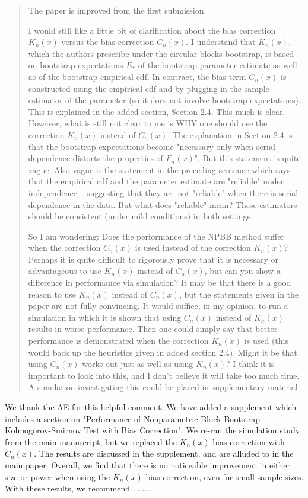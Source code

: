 \documentclass[12pt]{article}
\newenvironment{comment}%
{\begin{quotation}\noindent\small\it\color{darkblue}\ignorespaces%
}{\end{quotation}}
\begin{document}
\begin{comment}
The paper is improved from the first submission.

I would still like a little bit of clarification about the bias correction $K_n(x)$ versus the bias correction $C_n(x)$. I understand that $K_n(x)$, which the authors prescribe under the circular blocks bootstrap, is based on bootstrap expectations $E_*$ of the bootstrap parameter estimate as well as of the bootstrap empirical cdf. In contract, the bias term $C_n(x)$ is constructed using the empirical cdf and by plugging in the sample estimator of the parameter (so it does not involve bootstrap expectations).  This is explained in the added section, Section 2.4.  This much is clear. However, what is still not clear to me is WHY one should use the correction $K_n(x)$ instead of $C_n(x)$. The explanation in Section 2.4 is that the bootstrap expectations become "necessary only when serial dependence distorts the properties of $F_n(x)$".  But this statement is quite vague.  Also vague is the statement in the preceding sentence which says that the empirical cdf and the parameter estimate are "reliable" under independence -- suggesting that they are not "reliable" when there is serial dependence in the data.  But what does "reliable" mean? These estimators should be consistent (under mild conditions) in both settings.

So I am wondering: Does the performance of the NPBB method suffer when the correction $C_n(x)$ is used instead of the correction $K_n(x)$?  Perhaps it is quite difficult to rigorously prove that it is necessary or advantageous to use $K_n(x)$ instead of $C_n(x)$, but can you show a difference in performance via simulation?  It may be that there is a good reason to use $K_n(x)$ instead of $C_n(x)$, but the statements given in the paper are not fully convincing.   It would suffice, in my opinion, to run a simulation in which it is shown that using $C_n(x)$ instead of $K_n(x)$ results in worse performance.  Then one could simply say that better performance is demonstrated when the correction $K_n(x)$ is used (this would back up the heuristics given in added section 2.4). Might it be that using $C_n(x)$ works out just as well as using $K_n(x)$?  I think it is important to look into this, and I don't believe it will take too much time. A simulation investigating this could be placed in supplementary material.
\end{comment}

We thank the AE for this helpful comment. We have added a supplement
which includes a section on "Performance of Nonparametric
Block Bootstrap Kolmogorov-Smirnov Test with \citet{babu2004goodness} Bias Correction". We re-ran the simulation study from the main
manuscript, but we replaced the $K_n(x)$ bias correction with $C_n(x)$.
The results are discussed in the supplement, and are alluded to in the main paper. Overall,
we find that there is no noticeable improvement in either size
or power when using the $K_n(x)$ bias correction, even for small sample
sizes. With these results, we recommend ........
\end{document}

